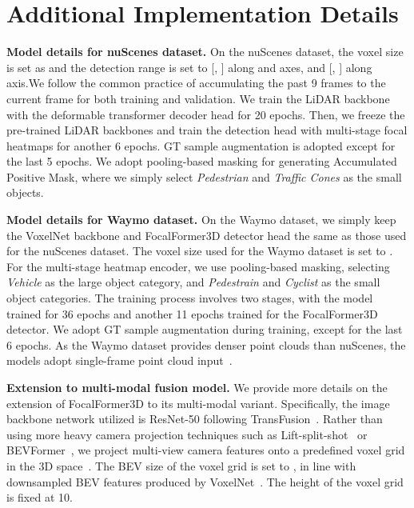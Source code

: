 \documentclass[10pt,twocolumn,letterpaper]{article}
\begin{document}
\section{Additional Implementation Details}
\label{sec:implementation-details}

\vspace{2mm}
\noindent\textbf{Model details for nuScenes dataset.}
On the nuScenes dataset, the voxel size is set as  and the detection range is set to [, ] along  and  axes, and [, ] along  axis.We follow the common practice of accumulating the past 9 frames to the current frame for both training and validation. We train the LiDAR backbone with the deformable transformer decoder head for 20 epochs. Then, we freeze the pre-trained LiDAR backbones and train the detection head with multi-stage focal heatmaps for another 6 epochs. GT sample augmentation is adopted except for the last 5 epochs. We adopt pooling-based masking for generating Accumulated Positive Mask, where we simply select \textsl{Pedestrian} and \textsl{Traffic Cones} as the small objects. 

\vspace{2mm}
\noindent\textbf{Model details for Waymo dataset.}
On the Waymo dataset, we simply keep the VoxelNet backbone and FocalFormer3D detector head the same as those used for the nuScenes dataset. The voxel size used for the Waymo dataset is set to . For the multi-stage heatmap encoder, we use pooling-based masking, selecting \textsl{Vehicle} as the large object category, and \textsl{Pedestrain} and \textsl{Cyclist} as the small object categories. The training process involves two stages, with the model trained for 36 epochs and another 11 epochs trained for the FocalFormer3D detector. We adopt GT sample augmentation during training, except for the last 6 epochs. As the Waymo dataset provides denser point clouds than nuScenes, the models adopt single-frame point cloud input~\cite{centerpoint, transfusion}. 


\vspace{2mm}
\noindent\textbf{Extension to multi-modal fusion model.}
We provide more details on the extension of FocalFormer3D to its multi-modal variant. Specifically, the image backbone network utilized is ResNet-50 following TransFusion~\cite{transfusion}. Rather than using more heavy camera projection techniques such as Lift-split-shot~\cite{liftsplatshoot} or BEVFormer~\cite{li2022bevformer}, we project multi-view camera features onto a predefined voxel grid in the 3D space~\cite{oftnet}. The BEV size of the voxel grid is set to , in line with  downsampled BEV features produced by VoxelNet~\cite{VoxelNet}. The height of the voxel grid is fixed at 10.
\end{document}
